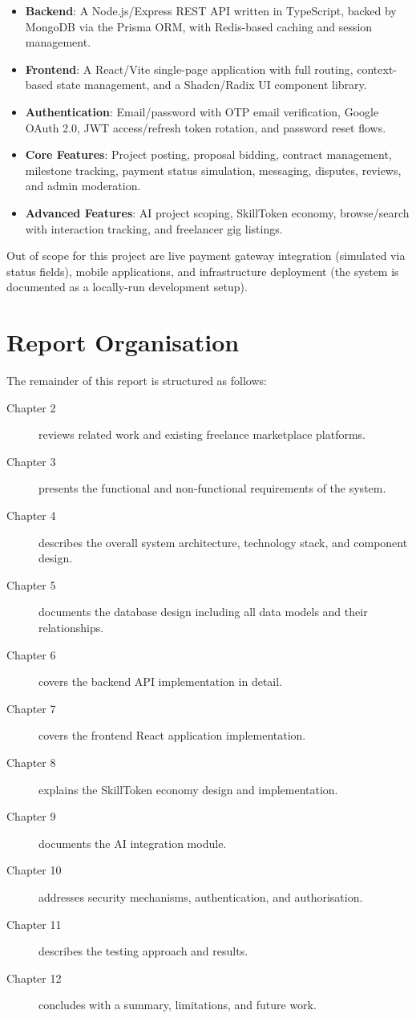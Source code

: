 \begin{itemize}
  \item \textbf{Backend}: A Node.js/Express REST API written in TypeScript, backed by MongoDB via the Prisma ORM, with Redis-based caching and session management.
  \item \textbf{Frontend}: A React/Vite single-page application with full routing, context-based state management, and a Shadcn/Radix UI component library.
  \item \textbf{Authentication}: Email/password with OTP email verification, Google OAuth 2.0, JWT access/refresh token rotation, and password reset flows.
  \item \textbf{Core Features}: Project posting, proposal bidding, contract management, milestone tracking, payment status simulation, messaging, disputes, reviews, and admin moderation.
  \item \textbf{Advanced Features}: AI project scoping, SkillToken economy, browse/search with interaction tracking, and freelancer gig listings.
\end{itemize}

Out of scope for this project are live payment gateway integration (simulated via status fields), mobile applications, and infrastructure deployment (the system is documented as a locally-run development setup).

\section{Report Organisation}

The remainder of this report is structured as follows:

\begin{description}
  \item[Chapter 2] reviews related work and existing freelance marketplace platforms.
  \item[Chapter 3] presents the functional and non-functional requirements of the system.
  \item[Chapter 4] describes the overall system architecture, technology stack, and component design.
  \item[Chapter 5] documents the database design including all data models and their relationships.
  \item[Chapter 6] covers the backend API implementation in detail.
  \item[Chapter 7] covers the frontend React application implementation.
  \item[Chapter 8] explains the SkillToken economy design and implementation.
  \item[Chapter 9] documents the AI integration module.
  \item[Chapter 10] addresses security mechanisms, authentication, and authorisation.
  \item[Chapter 11] describes the testing approach and results.
  \item[Chapter 12] concludes with a summary, limitations, and future work.
\end{description}
